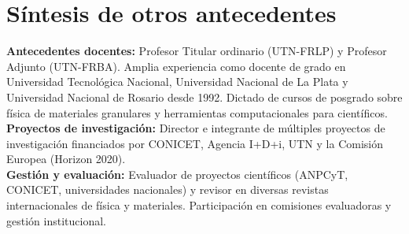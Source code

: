 \section*{Síntesis de otros antecedentes}
\textbf{Antecedentes docentes:} Profesor Titular ordinario (UTN-FRLP) y Profesor Adjunto (UTN-FRBA). Amplia experiencia como docente de grado en Universidad Tecnológica Nacional, Universidad Nacional de La Plata y Universidad Nacional de Rosario desde 1992. Dictado de cursos de posgrado sobre física de materiales granulares y herramientas computacionales para científicos. \\

\textbf{Proyectos de investigación:} Director e integrante de múltiples proyectos de investigación financiados por CONICET, Agencia I+D+i, UTN y la Comisión Europea (Horizon 2020). \\

\textbf{Gestión y evaluación:} Evaluador de proyectos científicos (ANPCyT, CONICET, universidades nacionales) y revisor en diversas revistas internacionales de física y materiales. Participación en comisiones evaluadoras y gestión institucional.
